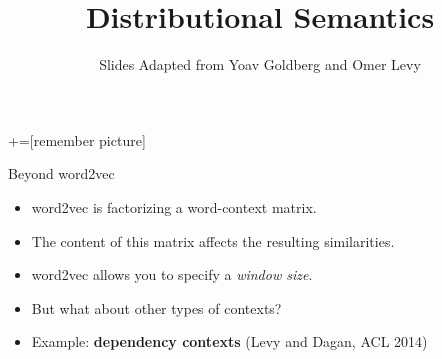 \documentclass[compress]{beamer}
\title{Distributional Semantics}
\date{Slides Adapted from Yoav Goldberg and Omer Levy}
\begin{document}
+=[remember picture]



\begin{frame}
  \titlepage
\end{frame}


\begin{frame}{Beyond word2vec}

    \begin{itemize}
        \item word2vec is factorizing a word-context matrix.
        \item The content of this matrix affects the resulting similarities.
        \item word2vec allows you to specify a \textit{window size}.
        \item But what about other types of contexts?
    \end{itemize}

    \begin{itemize}
        \item Example: \textbf{dependency contexts} {\footnotesize (Levy and
            Dagan, ACL 2014)}
    \end{itemize}

\end{frame}

{

}
\end{document}
